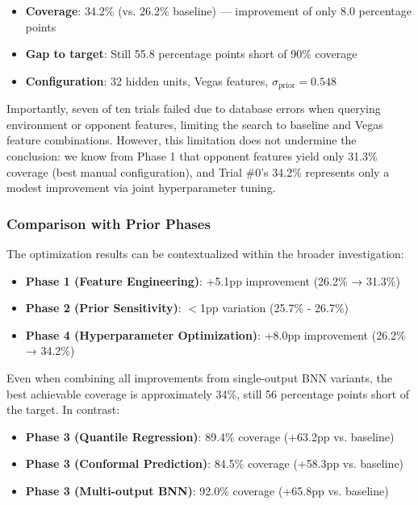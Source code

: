 \begin{itemize}
    \item \textbf{Coverage}: 34.2\% (vs. 26.2\% baseline) — improvement of only 8.0 percentage points
    \item \textbf{Gap to target}: Still 55.8 percentage points short of 90\% coverage
    \item \textbf{Configuration}: 32 hidden units, Vegas features, $\sigma_{\text{prior}} = 0.548$
\end{itemize}

Importantly, seven of ten trials failed due to database errors when querying environment or opponent features, limiting the search to baseline and Vegas feature combinations. However, this limitation does not undermine the conclusion: we know from Phase 1 that opponent features yield only 31.3\% coverage (best manual configuration), and Trial \#0's 34.2\% represents only a modest improvement via joint hyperparameter tuning.

\subsubsection{Comparison with Prior Phases}

The optimization results can be contextualized within the broader investigation:

\begin{itemize}
    \item \textbf{Phase 1 (Feature Engineering)}: +5.1pp improvement (26.2\% → 31.3\%)
    \item \textbf{Phase 2 (Prior Sensitivity)}: $<$1pp variation (25.7\% - 26.7\%)
    \item \textbf{Phase 4 (Hyperparameter Optimization)}: +8.0pp improvement (26.2\% → 34.2\%)
\end{itemize}

Even when combining all improvements from single-output BNN variants, the best achievable coverage is approximately 34\%, still 56 percentage points short of the target. In contrast:

\begin{itemize}
    \item \textbf{Phase 3 (Quantile Regression)}: 89.4\% coverage (+63.2pp vs. baseline)
    \item \textbf{Phase 3 (Conformal Prediction)}: 84.5\% coverage (+58.3pp vs. baseline)
    \item \textbf{Phase 3 (Multi-output BNN)}: 92.0\% coverage (+65.8pp vs. baseline)
\end{itemize}


